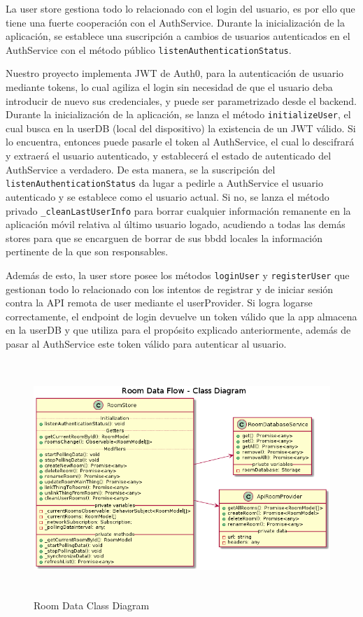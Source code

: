 La user store gestiona todo lo relacionado con el login del usuario, es por ello que tiene una fuerte cooperación con el AuthService. Durante la inicialización de la aplicación, se establece una suscripción a cambios de usuarios autenticados en el AuthService con el método público \verb|listenAuthenticationStatus|.

Nuestro proyecto implementa JWT de Auth0, para la autenticación de usuario mediante tokens, lo cual agiliza el login sin necesidad de que el usuario deba introducir de nuevo sus credenciales, y puede ser parametrizado desde el backend. Durante la inicialización de la aplicación, se lanza el método \verb|initializeUser|, el cual busca en la userDB (local del dispositivo) la existencia de un JWT válido. Si lo encuentra, entonces puede pasarle el token al AuthService, el cual lo descifrará y extraerá el usuario autenticado, y establecerá el estado de autenticado del AuthService a verdadero. De esta manera, se la suscripción del \verb|listenAuthenticationStatus| da lugar a pedirle a AuthService el usuario autenticado y se establece como el usuario actual. Si no, se lanza el método privado \verb|_cleanLastUserInfo| para borrar cualquier información remanente en la aplicación móvil relativa al último usuario logado, acudiendo a todas las demás stores para que se encarguen de borrar de sus \gls{bbdd} locales la información pertinente de la que son responsables.

Además de esto, la user store posee los métodos \verb|loginUser| y \verb|registerUser| que gestionan todo lo relacionado con los intentos de registrar y de iniciar sesión contra la API remota de user mediante el userProvider. Si logra logarse correctamente, el endpoint de login devuelve un token válido que la app almacena en la userDB y que utiliza para el propósito explicado anteriormente, además de pasar al AuthService este token válido para autenticar al usuario.

\begin{figure}[hbt!]
\centering
\includegraphics[height=3.5in]{figures/diagrams/front/data-flow/room.png}
\caption[room]{Room Data Class Diagram\footnotemark}
\end{figure}


